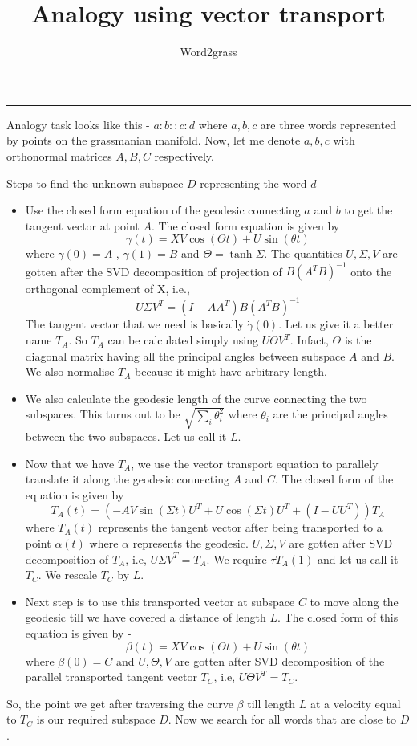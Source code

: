 \documentclass[a4paper,11pt]{article}
\title{Analogy using vector transport}
\author{Word2grass}
\begin{document}
\maketitle
\begin{center}
\rule{\textwidth}{1pt}
\end{center}

\noindent 
Analogy task looks like this - $a:b :: c:d$
where $a,b,c$ are three words represented by points on the grassmanian manifold. 
Now, let me denote $a,b,c$ with orthonormal matrices $A,B,C$ respectively.

\noindent Steps to find the unknown subspace $D$ representing the word $d$ - 

\begin{itemize}
  \item Use the closed form equation of the geodesic connecting $a$ and $b$ to get the tangent vector at point $A$. The closed form equation is given by 
  \[\gamma(t) = XV\cos(\Theta t) + U\sin(\theta t)\] where $\gamma(0)=A$ , $\gamma(1)=B$ and $\Theta = \tanh{\Sigma}$. The quantities $U,\Sigma, V$ are gotten after the SVD decomposition of projection of $B(A^TB)^{-1}$ onto the orthogonal complement of X, i.e.,
  \[U\Sigma V^T = (I - AA^T)B(A^TB)^{-1}\]
  The tangent vector that we need is basically $\dot \gamma(0)$. Let us give it a better name $T_A$. So $T_A$ can be calculated simply using $U \Theta V^T$. Infact, $\Theta$ is the diagonal matrix having all the principal angles between subspace $A$ and $B$. 
  We also normalise $T_A$ because it might have arbitrary length.
  \item We also calculate the geodesic length of the curve connecting the two subspaces. This turns out to be $\sqrt{\sum_i \theta_i^{2}}$ where $\theta_i$ are the principal angles between the two subspaces. Let us call it $L$.
  \item Now that we have $T_A$, we use the vector transport equation to parallely translate it along the geodesic connecting $A$ and $C$. The closed form of the equation is given by 
  \[T_A(t) = (-AV \sin(\Sigma t)U^T + U\cos (\Sigma t)U^T + (I - UU^T))T_A \] where $T_A(t)$ represents the tangent vector after being transported to a point $\alpha(t)$ where $\alpha$ represents the geodesic. $U,\Sigma, V$ are gotten after SVD decomposition of $T_A$, i.e, $U \Sigma V^T = T_A$. We require $\tau T_A(1)$ and let us call it $T_C$.
  We rescale $T_C$ by $L$.  
  \item Next step is to use this transported vector at subspace $C$ to move along the geodesic till we have covered a distance of length $L$. The closed form of this equation is given by - 
  \[\beta(t) = XV\cos(\Theta t) + U\sin(\theta t) \] where $\beta(0) = C$ and $U,\Theta, V$ are gotten after SVD decomposition of the parallel transported tangent vector $T_C$, i.e, $U\Theta V^T = T_{C}$.
\end{itemize}

\noindent So, the point we get after traversing the curve $\beta$ till length $L$ at a velocity equal to $T_{C}$ is our required subspace $D$. Now we search for all words that are close to $D$.
\end{document}
